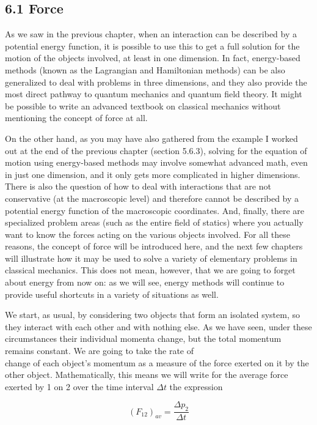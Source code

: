\documentclass[10pt]{article}
\begin{document}
\subsection*{6.1 Force}
As we saw in the previous chapter, when an interaction can be described by a potential energy function, it is possible to use this to get a full solution for the motion of the objects involved, at least in one dimension. In fact, energy-based methods (known as the Lagrangian and Hamiltonian methods) can be also generalized to deal with problems in three dimensions, and they also provide the most direct pathway to quantum mechanics and quantum field theory. It might be possible to write an advanced textbook on classical mechanics without mentioning the concept of force at all.

On the other hand, as you may have also gathered from the example I worked out at the end of the previous chapter (section 5.6.3), solving for the equation of motion using energy-based methods may involve somewhat advanced math, even in just one dimension, and it only gets more complicated in higher dimensions. There is also the question of how to deal with interactions that are not conservative (at the macroscopic level) and therefore cannot be described by a potential energy function of the macroscopic coordinates. And, finally, there are specialized problem areas (such as the entire field of statics) where you actually want to know the forces acting on the various objects involved. For all these reasons, the concept of force will be introduced here, and the next few chapters will illustrate how it may be used to solve a variety of elementary problems in classical mechanics. This does not mean, however, that we are going to forget about energy from now on: as we will see, energy methods will continue to provide useful shortcuts in a variety of situations as well.

We start, as usual, by considering two objects that form an isolated system, so they interact with each other and with nothing else. As we have seen, under these circumstances their individual momenta change, but the total momentum remains constant. We are going to take the rate of\\
change of each object's momentum as a measure of the force exerted on it by the other object. Mathematically, this means we will write for the average force exerted by 1 on 2 over the time interval $\Delta t$ the expression


\begin{equation*}
\left(F_{12}\right)_{a v}=\frac{\Delta p_{2}}{\Delta t} \tag{6.1}
\end{equation*}
\end{document}
